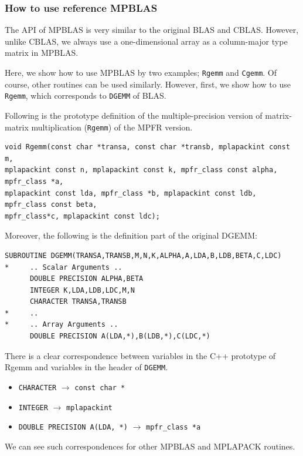 \documentclass[12pt]{article}
\begin{document}
\subsubsection{How to use reference MPBLAS}
The API of MPBLAS is very similar to the original BLAS and CBLAS. However, unlike CBLAS, we always use a one-dimensional array as a column-major type matrix in MPBLAS.

Here, we show how to use MPBLAS by two examples; {\tt Rgemm} and {\tt Cgemm}. Of course, other routines can be used similarly. However, first, we show how to use {\tt Rgemm}, which corresponds to {\tt DGEMM} of BLAS.

Following is the prototype definition of the multiple-precision version of matrix-matrix multiplication ({\tt Rgemm}) of the MPFR version.
\begin{verbatim}
void Rgemm(const char *transa, const char *transb, mplapackint const m,
mplapackint const n, mplapackint const k, mpfr_class const alpha, mpfr_class *a,
mplapackint const lda, mpfr_class *b, mplapackint const ldb, mpfr_class const beta,
mpfr_class*c, mplapackint const ldc);
\end{verbatim}
Moreover, the following is the definition part of the original DGEMM:
\begin{verbatim}
SUBROUTINE DGEMM(TRANSA,TRANSB,M,N,K,ALPHA,A,LDA,B,LDB,BETA,C,LDC)
*     .. Scalar Arguments ..
      DOUBLE PRECISION ALPHA,BETA
      INTEGER K,LDA,LDB,LDC,M,N
      CHARACTER TRANSA,TRANSB
*     ..
*     .. Array Arguments ..
      DOUBLE PRECISION A(LDA,*),B(LDB,*),C(LDC,*)
\end{verbatim}
There is a clear correspondence between variables in the C++ prototype of Rgemm and variables in the header of {\tt DGEMM}.
\begin{itemize}
    \item {\tt CHARACTER} $\rightarrow$ {\tt const char *}
    \item {\tt INTEGER} $\rightarrow$ {\tt mplapackint}
    \item {\tt DOUBLE PRECISION A(LDA, *)} $\rightarrow$ {\tt mpfr_class *a}
\end{itemize}
We can see such correspondences for other MPBLAS and MPLAPACK routines.
\end{document}
